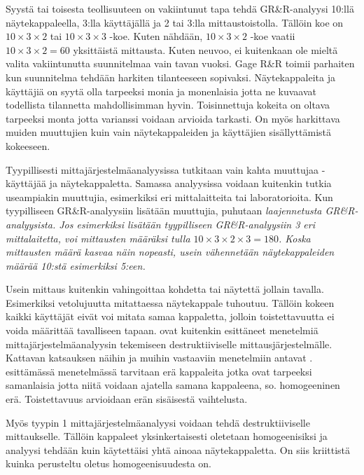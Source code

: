 \documentclass[12pt,a4paper,finnish]{tutthesis}
\begin{document}
Syystä tai toisesta teollisuuteen on vakiintunut tapa tehdä GR\&R-analyysi
10:llä näytekappaleella, 3:lla käyttäjällä ja 2 tai 3:lla mittaustoistolla.
Tällöin koe on $10 \times 3 \times 2$ tai $10 \times 3 \times 3$ -koe.
Kuten nähdään, $10 \times 3 \times 2$ -koe vaatii $10 \times 3 \times 2 = 60$
yksittäistä mittausta. Kuten \textcite{kitska2014} neuvoo, ei kuitenkaan ole mieltä
valita vakiintunutta suunnitelmaa vain tavan vuoksi. Gage R\&R toimii
parhaiten kun suunnitelma tehdään harkiten tilanteeseen sopivaksi.
Näytekappaleita ja käyttäjiä on syytä olla tarpeeksi monia ja monenlaisia
jotta ne kuvaavat todellista tilannetta mahdollisimman hyvin.
Toisinnettuja kokeita on oltava tarpeeksi monta jotta varianssi voidaan
arvioida tarkasti. On myös harkittava muiden muuttujien kuin vain näytekappaleiden
ja käyttäjien sisällyttämistä kokeeseen.

Tyypillisesti mittajärjestelmäanalyysissa tutkitaan vain kahta muuttujaa -
käyttäjää ja näytekappaletta. Samassa analyysissa voidaan kuitenkin
tutkia useampiakin muuttujia, esimerkiksi eri mittalaitteita tai laboratorioita. Kun
tyypilliseen GR\&R-analyysiin lisätään muuttujia, puhutaan
\em laajennetusta \em GR\&R-analyysista. Jos esimerkiksi lisätään
tyypilliseen GR\&R-analyysiin 3 eri mittalaitetta, voi mittausten määräksi
tulla $10 \times 3 \times 2 \times 3 = 180$. Koska mittausten määrä
kasvaa näin nopeasti, usein vähennetään näytekappaleiden määrää
10:stä esimerkiksi 5:een.



Usein mittaus kuitenkin vahingoittaa kohdetta tai näytettä jollain tavalla.
Esimerkiksi vetolujuutta mitattaessa näytekappale tuhoutuu. Tällöin
kokeen kaikki käyttäjät eivät voi mitata samaa kappaletta, jolloin toistettavuutta
ei voida määrittää tavalliseen tapaan. \textcite{mitchell1997,bergeret2002improving}
ovat kuitenkin esittäneet menetelmiä mittajärjestelmäanalyysin tekemiseen
destruktiiviselle mittausjärjestelmälle. Kattavan katsauksen näihin ja
muihin vastaaviin menetelmiin antavat \textcite{Mast2005}.
\textcite{Gorman2002} esittämässä menetelmässä tarvitaan erä kappaleita
jotka ovat tarpeeksi samanlaisia jotta niitä voidaan ajatella samana kappaleena,
so. homogeeninen erä. Toistettavuus arvioidaan erän sisäisestä vaihtelusta.

Myös tyypin 1 mittajärjestelmäanalyysi voidaan tehdä destruktiiviselle
mittaukselle. Tällöin kappaleet yksinkertaisesti oletetaan homogeenisiksi
ja analyysi tehdään kuin käytettäisi yhtä ainoaa näytekappaletta.
On siis kriittistä kuinka perusteltu oletus homogeenisuudesta on.
\end{document}
